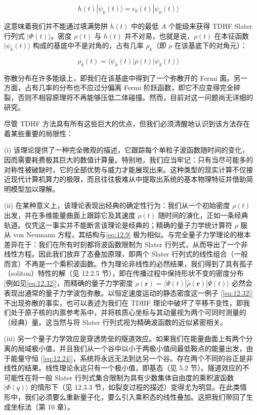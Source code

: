 \begin{equation}
h(t)|\psi_{k}(t)\rangle=\epsilon_{k}(t)|\psi_{k}(t)\rangle\label{eq:12.39}
\end{equation}

这意味着我们并不能通过填满势阱 $h(t)$ 中的最低 $A$ 个能级来获得 TDHF Slater 行列式 $|\Phi(t)\rangle$。密度
$\rho(t)$ 与 $h(t)$ 并不对易，也就是说，$\rho(t)$ 在本征函数 $|\psi_{k}(t)\rangle$
构成的基底中不是对角的，占有几率 $\rho_{k}$（即 $\rho$ 在该基底下的对角元）：

\begin{equation}
\rho_{k}(t)=\langle\psi_{k}(t)|\rho(t)|\psi_{k}(t)\rangle\label{eq:12.40}
\end{equation}

弥散分布在许多能级上，即我们在该基底中得到了一个弥散开的 Fermi 面。另一方面，占有几率的分布也不应过分偏离 Fermi 阶跃函数，即它不应变得完全碎裂，否则不相容原理将不再能够压低二体碰撞。然而，目前对这一问题尚无详细的研究。

尽管 TDHF 方法具有所有这些巨大的优点，但我们必须清醒地认识到该方法存在着某些重要的局限性：

(i) 该理论提供了一种完全微观的描述，它跟踪每个单粒子波函数随时间的变化，因而需要耗费极其巨大的数值计算量。特别地，我们应当牢记：只有当尽可能多的对称性被破缺时，它的全部优势与威力才能展现出来。这种类型的现实计算不仅接近现代计算机算力的极限，而且往往极难从中提取出系统的基本物理特征并借助简明模型加以理解。

(ii) 在某种意义上，该理论表现出经典的确定性行为：我们从一个初始密度 $\rho(t)$ 出发，并在多维能量曲面上跟踪它及其速度
$\dot{\rho}(t)$ 随时间的演化，正如一条经典轨道。仅凭这一事实并不能断言该理论是经典的；精确的量子力学统计算符 $\rho$
服从 von Neumann 方程，其结构与\ref{eq:12.9} 极为相似。与完全量子力学理论的根本差异在于：我们在所有时刻都将波函数限制为
Slater 行列式，从而导出了一个非线性方程。因此我们放弃了态叠加原理，即两个 Slater 行列式的线性组合（一般而言）不再是一个乘积波函数。作为理论非线性的必然结果，我们得到了具有孤子（soliton）特性的解（见
12.2.5 节），即在传播过程中保持形状不变的密度分布 {[}例如见\ref{eq:12.32}{]}，而精确的量子力学密度 $\rho(\boldsymbol{r})=\langle\Psi(t)|\hat{\rho}(\boldsymbol{r})|\Psi(t)\rangle$
必然会表现出通常的量子力学波包弥散。以恒定速度运动的静态密度这一例子 {[}\ref{eq:12.32}{]} 不出现弥散的事实，也可以表述为我们在
TDHF 理论中破坏了平移不变性，即我们处于原子核的内禀参考系中，并将核质心坐标与其动量视为两个可同时测量的（经典）量。这当然与将
Slater 行列式视为精确波函数的近似紧密相关。

(iii) 另一个量子力学效应是穿透势垒的隧道效应。如果我们在能量曲面上有两个分离的局域极小值，并且我们从一个谷中以小于两极小值间最低鞍点的能量出发，由于能量守恒
{[}\ref{eq:12.24}{]}，系统将永远无法到达另一个谷。存在两个不同的谷正是非线性的结果。线性理论永远只有一个极小值，即基态（见
5.2 节）。隧道效应的不可能性在将一般 Slater 行列式集合限制为具有少数集体自由度的乘积波函数 $|\Phi(q)\rangle$
的情形下（见 12.3.3 节，如裂变过程的描述）变得尤为明显。在此类情形中，我们必须要么重新量子化，要么引入乘积态的线性叠加。这把我们带回了生成坐标法（第
10 章）。


